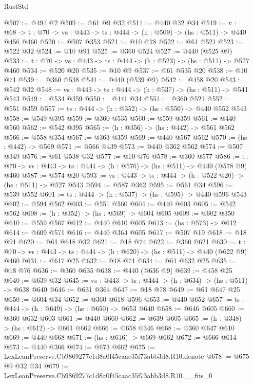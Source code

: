 \begin{lexlean}{RustStd}
\begin{coremodule}
@507 := @491 @2
@509 := @61 @9 @32
@511 := @440 @32 @34
@519 := {v : @68} ->
  {t : @70} -> {vs : @443} -> {ts : @444} -> (h : @509) -> (hs : @511) -> @440 @456 @460
@520 := @507 @353
@521 := @10 @78
@522 := @61 @521
@523 := @522 @32
@524 := @10 @91
@525 := @360 @524
@527 := @440 (@525 @9)
@533 := {t : @70} -> {vs : @443} -> {ts : @444} -> (h : @523) -> (hs : @511) -> @527 @460
@534 := @520 @20
@535 := @10 @9
@537 := @61 @535 @20
@538 := @10 @71
@539 := @360 @538
@541 := @440 (@539 @9)
@542 := @458 @20
@543 := @542 @32
@548 := {vs : @443} -> {ts : @444} -> (h : @537) -> (hs : @511) -> @541 @543
@549 := @534 @359
@550 := @441 @34
@551 := @360 @521
@552 := @551 @359
@557 := {ts : @444} -> (h : @352) -> (hs : @550) -> @440 @552 @543
@558 := @549 @395
@559 := @360 @535
@560 := @559 @359
@561 := @440 @560
@562 := @542 @395
@565 := (h : @356) -> (hs : @442) -> @561 @562
@566 := @558 @354
@567 := @363 @359
@569 := @440 @567 @562
@570 := (hs : @442) -> @569
@571 := @566 @439
@573 := @440 @362 @562
@574 := @507 @349
@576 := @61 @538 @32
@577 := @10 @76
@578 := @360 @577
@586 := {t : @70} -> {vs : @443} -> {ts : @444} -> (h : @576) -> (hs : @511) -> @440 (@578 @9) @460
@587 := @574 @20
@593 := {vs : @443} -> {ts : @444} -> (h : @522 @20) -> (hs : @511) -> @527 @543
@594 := @587 @362
@595 := @561 @34
@596 := @539 @552
@601 := {ts : @444} -> (h : @537) -> (hs : @595) -> @440 @596 @543
@602 := @594 @562
@603 := @551 @560
@604 := @440 @603
@605 := @542 @562
@608 := (h : @352) -> (hs : @569) -> @604 @605
@609 := @602 @350
@610 := @559 @567
@612 := @440 @610 @605
@613 := (hs : @573) -> @612
@614 := @609 @571
@616 := @440 @364 @605
@617 := @507 @19
@618 := @18 @91
@620 := @61 @618 @32
@621 := @18 @74
@622 := @360 @621
@630 := {t : @70} -> {vs : @443} -> {ts : @444} -> (h : @620) -> (hs : @511) -> @440 (@622 @9) @460
@631 := @617 @25
@632 := @18 @71
@634 := @61 @632 @25
@635 := @18 @76
@636 := @360 @635
@638 := @440 (@636 @9)
@639 := @458 @25
@640 := @639 @32
@645 := {vs : @443} -> {ts : @444} -> (h : @634) -> (hs : @511) -> @638 @640
@646 := @631 @364
@647 := @18 @78
@649 := @61 @647 @25
@650 := @604 @34
@652 := @360 @618 @596
@653 := @440 @652
@657 := {ts : @444} -> (h : @649) -> (hs : @650) -> @653 @640
@658 := @646 @605
@660 := @360 @632 @603
@661 := @440 @660
@662 := @639 @605
@665 := (h : @348) -> (hs : @612) -> @661 @662
@666 := @658 @346
@668 := @360 @647 @610
@669 := @440 @668
@671 := (hs : @616) -> @669 @662
@672 := @666 @614
@673 := @440 @366
@674 := @673 @662
@675 := LexLeanPreserve.Cb9869277c1d8a0f45caac35f73abb3d8.R10.denote
@678 := @675 @9 @32 @34
@679 := LexLeanPreserve.Cb9869277c1d8a0f45caac35f73abb3d8.R10.__fits_0

\end{coremodule}
\end{lexlean}
